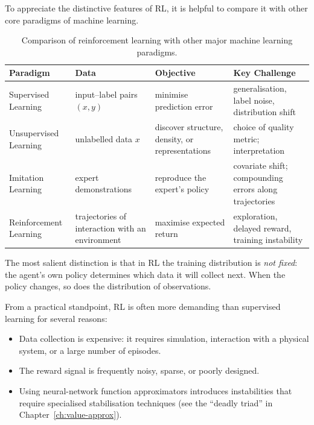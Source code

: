 To appreciate the distinctive features of RL, it is helpful to compare it with other core paradigms of machine learning.

\begin{table}[ht]
\centering
\renewcommand{\arraystretch}{1.3}
\begin{tabular}{@{}p{2.6cm}p{2.9cm}p{3.2cm}p{3.6cm}@{}}
\toprule
\textbf{Paradigm} & \textbf{Data} & \textbf{Objective} & \textbf{Key Challenge} \\
\midrule
Supervised Learning &
input--label pairs $(x,y)$ &
minimise prediction error &
generalisation, label noise, distribution shift \\
\addlinespace
Unsupervised Learning &
unlabelled data $x$ &
discover structure, density, or representations &
choice of quality metric; interpretation \\
\addlinespace
Imitation Learning &
expert demonstrations &
reproduce the expert's policy &
covariate shift; compounding errors along trajectories \\
\addlinespace
Reinforcement Learning &
trajectories of interaction with an environment &
maximise expected return &
exploration, delayed reward, training instability \\
\bottomrule
\end{tabular}
\caption{Comparison of reinforcement learning with other major machine learning paradigms.}
\label{tab:rl-vs-ml}
\end{table}

The most salient distinction is that in RL the training distribution is \emph{not fixed}: the agent's own policy determines which data it will collect next.  When the policy changes, so does the distribution of observations.

From a practical standpoint, RL is often more demanding than supervised learning for several reasons:
\begin{itemize}[leftmargin=*]
\item Data collection is expensive: it requires simulation, interaction with a physical system, or a large number of episodes.
\item The reward signal is frequently noisy, sparse, or poorly designed.
\item Using neural-network function approximators introduces instabilities that require specialised stabilisation techniques (see the ``deadly triad'' in Chapter~\ref{ch:value-approx}).
\end{itemize}



